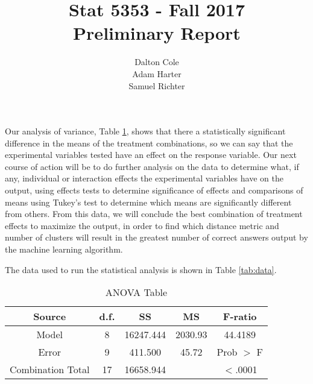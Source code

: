 \documentclass[times]{article}
\begin{document}
	\title{Stat 5353  - Fall 2017 \\ Preliminary Report}
	\author{Dalton Cole \\ Adam Harter \\ Samuel Richter}
	\date{}
	\maketitle
	
	Our analysis of variance, Table \ref{tab:anova}, shows that there a statistically significant difference in the means of the treatment combinations, so we can say that the experimental variables tested have an effect on the response variable. Our next course of action will be to do further analysis on the data to determine what, if any, individual or interaction effects the experimental variables have on the output, using effects tests to determine significance of effects and comparisons of means using Tukey's test to determine which means are significantly different from others. From this data, we will conclude the best combination of treatment effects to maximize the output, in order to find which distance metric and number of clusters will result in the greatest number of correct answers output by the machine learning algorithm.

	The data used to run the statistical analysis is shown in Table \ref{tab:data}.



	\begin{table}[!h]
		\centering
		\caption{ANOVA Table}
		\label{tab:anova}
		\begin{tabular}{| c | c | c | c | c |}
			\hline
			Source 					& d.f.	& SS		& MS 		& F-ratio 	\\
			\hline
			Model					& 8		& 16247.444	& 2030.93	& 44.4189	\\
			\hline
			Error					& 9		& 411.500	& 45.72		& Prob $>$ F	\\
			\hline
			Combination Total		& 17	& 16658.944	& 			& $<$.0001 	\\
			\hline
		\end{tabular}
	\end{table}
\end{document}
